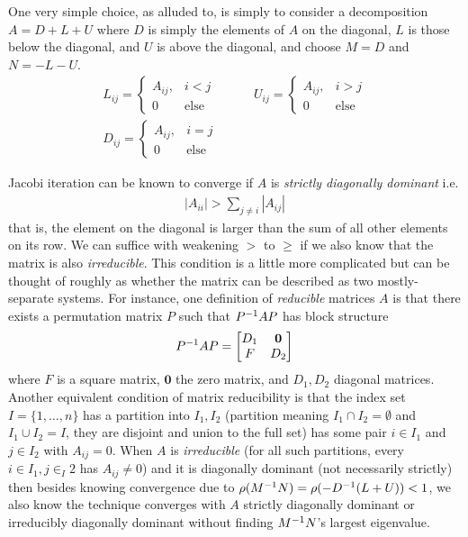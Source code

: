 \documentclass[11pt]{article}
\begin{document}
One very simple choice, as alluded to, is simply to consider a decomposition $A = D + L + U$ where $D$ is simply the elements of $A$ on the diagonal, $L$ is those below the diagonal, and $U$ is above the diagonal, and choose $M = D$ and $N = - L - U$. \begin{gather*}
L_{ij} = \left\{ \begin{matrix} A_{ij}, & i < j \\ 0 & \text{else} \end{matrix}\right. \hspace{3em}
U_{ij} = \left\{ \begin{matrix} A_{ij}, & i > j \\ 0 & \text{else} \end{matrix}\right. \\
D_{ij} = \left\{ \begin{matrix} A_{ij}, & i = j \\ 0 & \text{else} \end{matrix}\right.
\end{gather*}

Jacobi iteration can be known to converge if $A$ is \emph{strictly diagonally dominant} i.e. \begin{gather*}
|A_{ii}| > \sum_{j \neq i} |A_{ij}|
\end{gather*}
that is, the element on the diagonal is larger than the sum of all other elements on its row. We can suffice with weakening $>$ to $\ge$ if we also know that the matrix is also \emph{irreducible}. This condition is a little more complicated but can be thought of roughly as whether the matrix can be described as two mostly-separate systems. For instance, one definition of \emph{reducible} matrices $A$ is that there exists a permutation matrix $P$ such that $P^{-1} A P$ has block structure \begin{gather*}
P^{-1} A P = \begin{bmatrix} D_1 & \mathbf{0} \\ F & D_2 \end{bmatrix}
\end{gather*}
where $F$ is a square matrix, $\mathbf 0$ the zero matrix, and $D_1,D_2$ diagonal matrices. Another equivalent condition of matrix reducibility is that the index set $I = \{ 1, \dots , n \}$ has a partition into $I_1, I_2$ (partition meaning $I_1 \cap I_2 = \emptyset$ and $I_1 \cup I_2 = I$, they are disjoint and union to the full set) has some pair $i \in I_1$ and $j \in I_2$ with $A_{ij} = 0$. When $A$ is \emph{irreducible} (for all such partitions, every $i\in I_1,j \in _I2$ has $A_{ij} \neq 0$) and it is diagonally dominant (not necessarily strictly) then besides knowing convergence due to $\rho(M^{-1} N) = \rho(- D^{-1} (L + U)) < 1$, we also know the technique converges with $A$ strictly diagonally dominant or irreducibly diagonally dominant without finding $M^{-1} N$'s largest eigenvalue.
\end{document}
